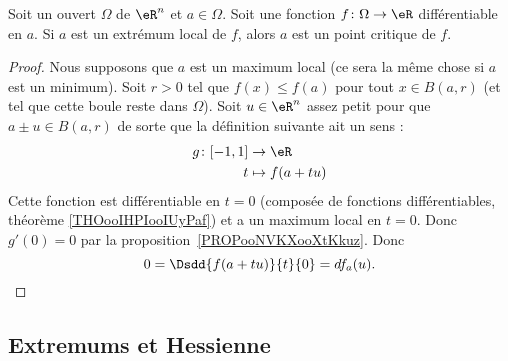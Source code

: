 \begin{proposition} \label{PropUQRooPgJsuz}
	Soit un ouvert \( \Omega\) de \( \eR^n\) et \( a\in \Omega\). Soit une fonction \( f\colon \Omega\to \eR\) différentiable en \( a\). Si \( a\) est un extrémum local de \( f\), alors \( a\) est un point critique de \( f\).
\end{proposition}

\begin{proof}
	Nous supposons que \( a\) est un maximum local (ce sera la même chose si \( a\) est un minimum). Soit \( r>0\) tel que \( f(x)\leq f(a)\) pour tout \( x\in B(a,r)\) (et tel que cette boule reste dans \( \Omega\)). Soit \( u\in \eR^n\) assez petit pour que \( a\pm u\in B(a,r)\) de sorte que la définition suivante ait un sens :
	\begin{equation}
		\begin{aligned}
			g\colon \mathopen[ -1 , 1 \mathclose] & \to \eR         \\
			t                                     & \mapsto f(a+tu)
		\end{aligned}
	\end{equation}
	Cette fonction est différentiable en \( t=0\) (composée de fonctions différentiables, théorème \ref{THOooIHPIooIUyPaf}) et a un maximum local en \( t=0\). Donc \( g'(0)=0\) par la proposition~\ref{PROPooNVKXooXtKkuz}. Donc
	\begin{equation}
		0=\Dsdd{ f(a+tu) }{t}{0}=df_a(u).
	\end{equation}
\end{proof}

\subsection{Extremums et Hessienne}

